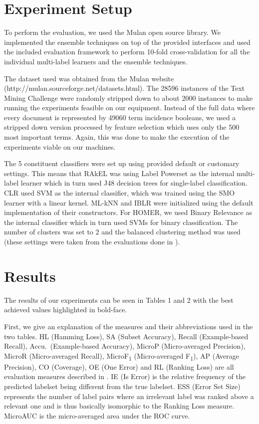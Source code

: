 \section{Experiment Setup}
To perform the evaluation, we used the Mulan \cite{mulan} open source
library. We implemented the ensemble techniques on top of the provided
interfaces and used the included evaluation framework to perform
10-fold cross-validation for all the individual multi-label learners
and the ensemble techniques.

The dataset used was obtained from the Mulan website
(http://mulan.sourceforge.net/datasets.html). The 28596 instances of
the Text Mining Challenge were randomly stripped down to about 2000
instances to make running the experiments feasible on our
equipment. Instead of the full data where every document is
represented by 49060 term incidence booleans, we used a stripped down
version processed by feature selection which uses only the 500 most
important terms. Again, this was done to make the execution of the
experiments viable on our machines.

The 5 constituent classifiers were set up using provided default or
customary settings. This means that RAkEL was using Label Powerset as
the internal multi-label learner which in turn used J48 decision trees
for single-label classification. CLR used SVM as the internal
classifier, which was trained using the SMO learner with a linear
kernel. ML-kNN and IBLR were initialized using the default
implementation of their constructors. For HOMER, we used Binary
Relevance as the internal classifier which in turn used SVMs for
binary classification. The number of clusters was set to 2 and the
balanced clustering method was used (these settings were taken from
the evaluations done in \cite{HOMER}).

\section{Results}




The results of our experiments can be seen in Tables 1 and 2 with the
best achieved values highlighted in bold-face.

First, we give an explanation of the measures and their abbreviations
used in the two tables. HL (Hamming Loss), SA (Subset Accuracy),
Recall (Example-based Recall), Accu.\ (Example-based Accuracy), MicroP
(Micro-averaged Precision), MicroR (Micro-averaged Recall),
MicroF\textsubscript{1} (Micro-averaged F\textsubscript{1}), AP
(Average Precision), CO (Coverage), OE (One Error) and RL (Ranking
Loss) are all evaluation measures described in \cite{MLLSlides}. IE
(Is Error) is the relative frequency of the predicted labelset being
different from the true labelset. ESS (Error Set Size) represents the
number of label pairs where an irrelevant label was ranked above a
relevant one and is thus basically isomorphic to the Ranking Loss
measure. MicroAUC is the micro-averaged area under the ROC curve.

